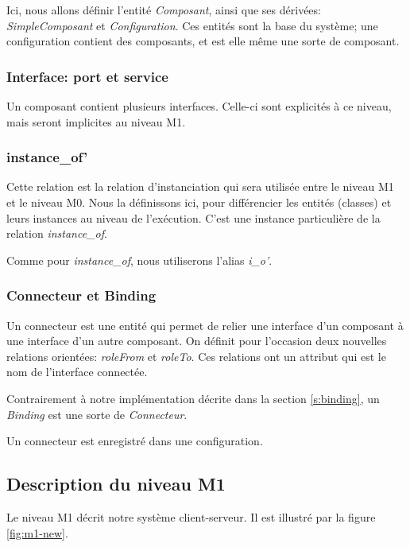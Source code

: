 \documentclass[french,a4paper,titlepage]{article}
\begin{document}
		
		Ici, nous allons définir l'entité \emph{Composant}, ainsi que ses dérivées: \emph{SimpleComposant} et \emph{Configuration}. Ces entités sont la base du système; une configuration contient des composants, et est elle même une sorte de composant.
		
		
		\subsubsection{Interface: port et service}
		
			Un composant contient plusieurs interfaces. Celle-ci sont explicités à ce niveau, mais seront implicites au niveau M1.
			
		\subsubsection{instance\_of'}
		
			Cette relation est la relation d'instanciation qui sera utilisée entre le niveau M1 et le niveau M0. Nous la définissons ici, pour différencier les entités (classes) et leurs instances au niveau de l'exécution. C'est une instance particulière de la relation \emph{instance\_of}.
			
			Comme pour \emph{instance\_of}, nous utiliserons l'alias \emph{i\_o'}.
			
			
			
		\subsubsection{Connecteur et Binding}
			Un connecteur est une entité qui permet de relier une interface d'un composant à une interface d'un autre composant. On définit pour l'occasion deux nouvelles relations orientées: \emph{roleFrom} et \emph{roleTo}. Ces relations ont un attribut qui est le nom de l'interface connectée.
			
			Contrairement à notre implémentation décrite dans la section \ref{s:binding}, un \emph{Binding} est une sorte de \emph{Connecteur}.
			
			Un connecteur est enregistré dans une configuration.
			
			
			
	\subsection{Description du niveau M1}
	
		Le niveau M1 décrit notre système client-serveur. Il est illustré par la figure \ref{fig:m1-new}.
	
\end{document}
